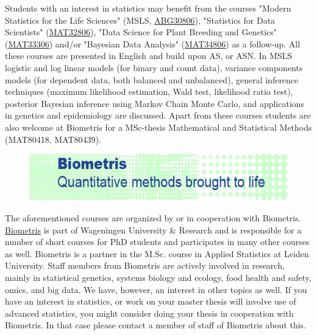 Students with an interest in statistics may benefit from the courses "Modern Statistics for the Life Sciences" (MSLS, \href{https://wur.osiris-student.nl/#/onderwijscatalogus/extern/cursus?cursuscode=ABG30806&collegejaar=huidig}{ABG30806}), "Statistics for Data Scientists" (\href{https://wur.osiris-student.nl/#/onderwijscatalogus/extern/cursus?cursuscode=MAT32806&collegejaar=huidig}{MAT32806}), "Data Science for Plant Breeding and Genetics" (\href{https://wur.osiris-student.nl/#/onderwijscatalogus/extern/cursus?cursuscode=MAT33306&collegejaar=huidig}{MAT33306}) and/or "Bayesian Data Analysis" (\href{https://wur.osiris-student.nl/#/onderwijscatalogus/extern/cursus?cursuscode=MAT34806&collegejaar=huidig}{MAT34806}) as a follow-up. All these courses are presented in English and build upon AS, or ASN. In MSLS logistic and log linear models (for binary and count data), variance components models (for dependent data, both balanced and unbalanced), general inference techniques (maximum likelihood estimation, Wald test, likelihood ratio test), posterior Bayesian inference using Markov Chain Monte Carlo, and applications in genetics and epidemiology are discussed. Apart from these courses students are also welcome at Biometris for a MSc-thesis Mathematical and Statistical Methods (MAT80418, MAT80439).

\begin{figure}[!h]%
  \begin{center}%
    \includegraphics[width=11.6cm]{biometris.png}%
    \label{fig:biometris}%
  \end{center}%
\end{figure}%

The aforementioned courses are organized by or in cooperation with Biometris. \href{https://www.wur.eu/biometris}{Biometris} is part of Wageningen University \& Research and is responsible for a number of short courses for PhD students and participates in many other courses as well. Biometris is a partner in the M.Sc. course in Applied Statistics at Leiden University. Staff members from Biometris are actively involved in research, mainly in statistical genetics, systems biology and ecology, food health and safety, omics, and big data. We have, however, an interest in other topics as well. If you have an interest in statistics, or work on your master thesis will involve use of advanced statistics, you might consider doing your thesis in cooperation with Biometris. In that case please contact a member of staff of Biometris about this.


\cleardoublepage\newpage
